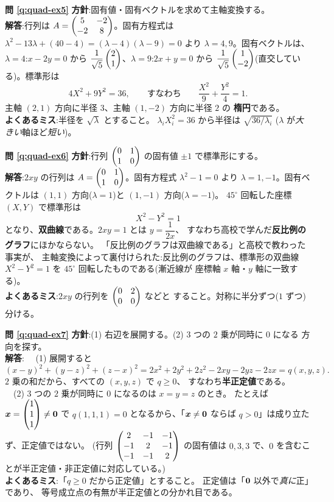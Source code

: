 \bigskip
\noindent\textbf{問 \ref{q:quad-ex5}}\quad
\textbf{方針}:固有値・固有ベクトルを求めて主軸変換する。\\
\textbf{解答}:行列は $A = \begin{pmatrix}5 & -2 \\ -2 & 8\end{pmatrix}$。固有方程式は
$\lambda^2 - 13\lambda + (40 - 4) = (\lambda - 4)(\lambda - 9) = 0$ より
$\lambda = 4, 9$。固有ベクトルは、$\lambda = 4$:$x - 2y = 0$ から
$\dfrac{1}{\sqrt{5}}\begin{pmatrix}2 \\ 1\end{pmatrix}$、$\lambda = 9$:$2x + y = 0$ から
$\dfrac{1}{\sqrt{5}}\begin{pmatrix}1 \\ -2\end{pmatrix}$(直交している)。標準形は
\[
4X^2 + 9Y^2 = 36, \qquad\text{すなわち}\qquad
\frac{X^2}{9} + \frac{Y^2}{4} = 1.
\]
主軸 $(2, 1)$ 方向に半径 $3$、主軸 $(1, -2)$ 方向に半径 $2$ の
\textbf{楕円}である。\\
\textbf{よくあるミス}:半径を $\sqrt{\lambda}$ とすること。
$\lambda_i X_i^2 = 36$ から半径は $\sqrt{36/\lambda_i}$
($\lambda$ が\emph{大きい}軸ほど\emph{短い})。

\bigskip
\noindent\textbf{問 \ref{q:quad-ex6}}\quad
\textbf{方針}:行列 $\begin{pmatrix}0 & 1 \\ 1 & 0\end{pmatrix}$ の固有値 $\pm 1$ で標準形にする。\\
\textbf{解答}:$2xy$ の行列は $A = \begin{pmatrix}0 & 1 \\ 1 & 0\end{pmatrix}$。固有方程式
$\lambda^2 - 1 = 0$ より $\lambda = 1, -1$。固有ベクトルは
$(1, 1)$ 方向($\lambda = 1$)と $(1, -1)$ 方向($\lambda = -1$)。
$45^\circ$ 回転した座標 $(X, Y)$ で標準形は
\[
X^2 - Y^2 = 1
\]
となり、\textbf{双曲線}である。$2xy = 1$ とは $y = \dfrac{1}{2x}$、
すなわち高校で学んだ\textbf{反比例のグラフ}にほかならない。
「反比例のグラフは双曲線である」と高校で教わった事実が、
主軸変換によって裏付けられた:反比例のグラフは、標準形の双曲線
$X^2 - Y^2 = 1$ を $45^\circ$ 回転したものである(漸近線が
座標軸 $x$ 軸・$y$ 軸に一致する)。\\
\textbf{よくあるミス}:$2xy$ の行列を $\begin{pmatrix}0 & 2 \\ 0 & 0\end{pmatrix}$ などと
すること。対称に半分ずつ($1$ ずつ)分ける。

\bigskip
\noindent\textbf{問 \ref{q:quad-ex7}}\quad
\textbf{方針}:(1) 右辺を展開する。(2) $3$ つの $2$ 乗が同時に $0$ になる
方向を探す。\\
\textbf{解答}:
　(1) 展開すると
\[
(x - y)^2 + (y - z)^2 + (z - x)^2
= 2x^2 + 2y^2 + 2z^2 - 2xy - 2yz - 2zx = q(x, y, z).
\]
$2$ 乗の和だから、すべての $(x, y, z)$ で $q \ge 0$、
すなわち\textbf{半正定値}である。\\
　(2) $3$ つの $2$ 乗が同時に $0$ になるのは $x = y = z$ のとき。
たとえば $\bm{x} = \begin{pmatrix}1 \\ 1 \\ 1\end{pmatrix} \neq \bm{0}$ で
$q(1, 1, 1) = 0$ となるから、「$\bm{x} \neq \bm{0}$ ならば
$q > 0$」は成り立たず、正定値ではない。
(行列 $\begin{pmatrix}2 & -1 & -1 \\ -1 & 2 & -1 \\ -1 & -1 & 2\end{pmatrix}$ の固有値は
$0, 3, 3$ で、$0$ を含むことが半正定値・非正定値に対応している。)\\
\textbf{よくあるミス}:「$q \ge 0$ だから正定値」とすること。
正定値は「$\bm{0}$ 以外で\emph{真に}正」であり、
等号成立点の有無が半正定値との分かれ目である。

